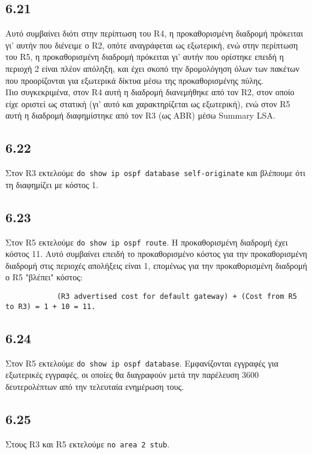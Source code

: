 \documentclass[a4paper, 12pt]{article}
\begin{document}
	\subsection*{6.21}
		Αυτό συμβαίνει διότι στην περίπτωση του R4, η προκαθορισμένη διαδρομή πρόκειται γι' αυτήν που διένειμε ο R2, οπότε αναγράφεται ως εξωτερική, ενώ στην περίπτωση του R5, η προκαθορισμένη διαδρομή πρόκειται γι' αυτήν που ορίστηκε επειδή η περιοχή 2 είναι πλέον απόληξη, και έχει σκοπό την δρομολόγηση όλων των πακέτων που προορίζονται για εξωτερικά δίκτυα μέσω της προκαθορισμένης πύλης. \\ 
		
		Πιο συγκεκριμένα, στον R4 αυτή η διαδρομή διανεμήθηκε από τον R2, στον οποίο είχε οριστεί ως στατική (γι' αυτό και χαρακτηρίζεται ως εξωτερική), ενώ στον R5 αυτή η διαδρομή διαφημίστηκε από τον R3 (ως ABR) μέσω Summary LSA.

	\subsection*{6.22}
		Στον R3 εκτελούμε \verb|do show ip ospf database self-originate| και βλέπουμε ότι τη διαφημίζει με κόστος 1.

	\subsection*{6.23}
		Στον R5 εκτελούμε \verb|do show ip ospf route|. Η προκαθορισμένη διαδρομή έχει κόστος 11. Αυτό συμβαίνει επειδή το προκαθορισμένο κόστος για την προκαθορισμένη διαδρομή στις περιοχές απολήξεις είναι 1, επομένως για την προκαθορισμένη διαδρομή ο R5 "βλέπει" κόστος:
		
		\begin{verbatim}
			(R3 advertised cost for default gateway) + (Cost from R5 to R3) = 1 + 10 = 11.
		\end{verbatim}

	\subsection*{6.24}
		Στον R5 εκτελούμε \verb|do show ip ospf database|. Εμφανίζονται εγγραφές για εξωτερικές εγγραφές, οι οποίες θα διαγραφούν μετά την παρέλευση 3600 δευτερολέπτων από την τελευταία ενημέρωση τους.

	\subsection*{6.25}
		Στους R3 και R5 εκτελούμε \verb|no area 2 stub|.
\end{document}

